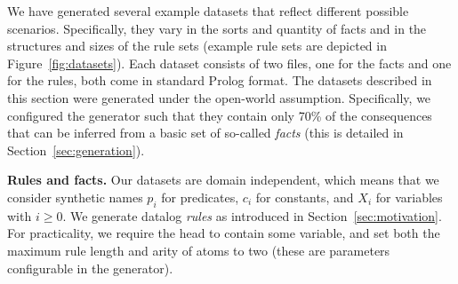 We have generated several example datasets that reflect different possible scenarios. Specifically, they vary in the sorts and quantity of facts and in the structures and sizes of the rule sets (example rule sets are depicted in Figure~\ref{fig:datasets}).
Each dataset consists of two files, one for the facts and one for the rules,
both come in standard Prolog format. 
%
The datasets described in this section were generated under the open-world assumption. Specifically,  %
we configured the generator such that they contain only 70\% of the consequences that can be inferred from a basic set of so-called \emph{\support facts} (this is detailed in Section~\ref{sec:generation}).

\textbf{Rules and facts.}
Our datasets are domain independent, which means that we consider synthetic names $p_i$ for %
{predicates}, $c_i$ for {constants}, and $X_i$ for {variables} with $i\ge0$. %
% 
We generate datalog \emph{rules} as introduced in Section~\ref{sec:motivation}.
% 
For practicality, we require the head to contain some variable, and set both the maximum rule length and arity of atoms to two (these are parameters configurable in the generator).
%

